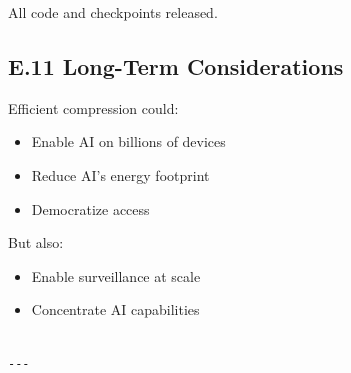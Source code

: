 All code and checkpoints released.

\subsection{E.11 Long-Term Considerations}

Efficient compression could:

\begin{itemize}
\item Enable AI on billions of devices
\item Reduce AI's energy footprint
\item Democratize access

\end{itemize}
But also:

\begin{itemize}
\item Enable surveillance at scale
\item Concentrate AI capabilities
\end{itemize}
\begin{lstlisting}

---
\end{lstlisting}